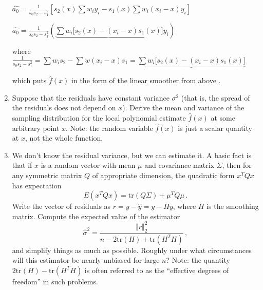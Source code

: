 \documentclass{homework}
\newcommand{\1}{\mathbf{1}}
\begin{document}
\begin{enumerate}[label=(\Alph*)]
\par $\hat{a_0} = \frac{1}{s_0s_2 - s_1^2}\left[  s_2(x)\sum w_iy_i  - s_1(x)\sum w_i(x_i - x)y_i \right]$
\par $\hat{a_0} = \frac{1}{s_0s_2 - s_1^2}\left(  \underbrace{ \sum w_i \big[ s_2(x)  - (x_i - x) s_1(x)} \big] y_i \right)$ 
     
\par where  $\frac{1}{s_0s_2 - s_1^2}  = \sum w_is_2 - \sum w(x_i - x)s_1 =  \underbrace{ \sum w_i \big[ s_2(x) - (x_i - x) s_1(x) \big]}$

\par which puts $\hat{f}(x)$ in the form of the linear smoother from above .



\item Suppose that the residuals have constant variance $\sigma^2$ (that is, the spread of the residuals does not depend on $x$).  Derive the mean and variance of the sampling distribution for the local polynomial estimate $\hat{f}(x)$ at some arbitrary point $x$.  Note: the random variable $\hat{f}(x)$ is just a scalar quantity at $x$, not the whole function.



\item We don't know the residual variance, but we can estimate it.  A basic fact is that if $x$ is a random vector with mean $\mu$ and covariance matrix $\Sigma$, then for any symmetric matrix $Q$ of appropriate dimension, the quadratic form $x^T Q x$ has expectation
$$
E(x^T Q x) = \mbox{tr}(Q \Sigma) + \mu^T Q \mu \, .
$$
Write the vector of residuals as $r = y - \hat{y} = y - Hy$, where $H$ is the smoothing matrix.  Compute the expected value of the estimator
$$
\hat{\sigma}^2 = \frac{\Vert r \Vert_2^2}{n - 2\mbox{tr}(H) + \mbox{tr}(H^T H)} \, ,
$$
and simplify things as much as possible.  Roughly under what circumstances will this estimator be nearly unbiased for large $n$?  Note: the quantity $2\mbox{tr}(H) - \mbox{tr}(H^T H)$ is often referred to as the ``effective degrees of freedom'' in such problems.


\end{enumerate}
\end{document}
